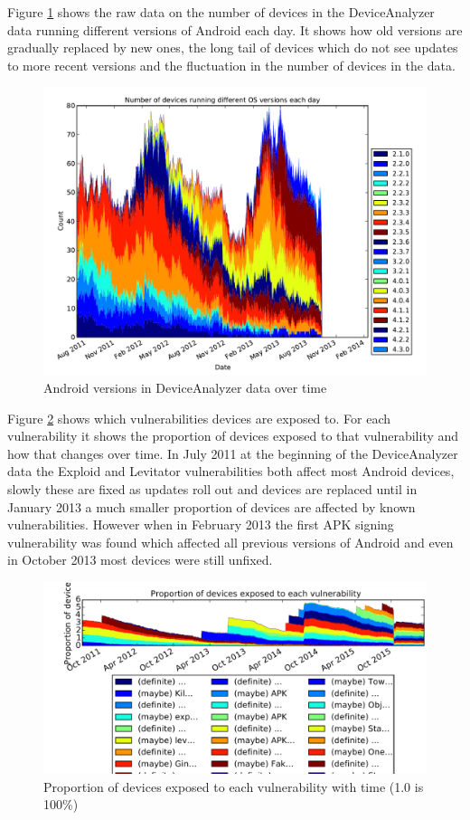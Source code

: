 \documentclass[conference,a4paper,twoside]{IEEEtran}
\begin{document}
Figure \ref{fig:os} shows the raw data on the number of devices in the DeviceAnalyzer data running different versions of Android each day.
It shows how old versions are gradually replaced by new ones, the long tail of devices which do not see updates to more recent versions and the fluctuation in the number of devices in the data.
\begin{figure}%
\centering
\includegraphics[width=\columnwidth]{figures/os}
\caption{Android versions in DeviceAnalyzer data over time}
\label{fig:os}
\end{figure}

Figure \ref{fig:vulnerabilities} shows which vulnerabilities devices are exposed to.
For each vulnerability it shows the proportion of devices exposed to that vulnerability and how that changes over time.
In July 2011 at the beginning of the DeviceAnalyzer data the Exploid and Levitator vulnerabilities both affect most Android devices, slowly these are fixed as updates roll out and devices are replaced until in January 2013 a much smaller proportion of devices are affected by known vulnerabilities.
However when in February 2013 the first APK signing vulnerability was found which affected all previous versions of Android and even in October 2013 most devices were still unfixed. %
\begin{figure}%
\centering
\includegraphics[width=\columnwidth]{figures/vulnerabilities}
\caption{Proportion of devices exposed to each vulnerability with time (1.0 is 100\%)}
\label{fig:vulnerabilities}
\end{figure}
\end{document}
